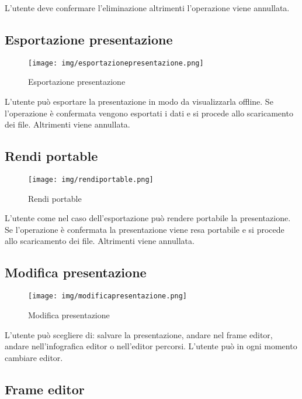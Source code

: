 L'utente deve confermare l'eliminazione altrimenti l'operazione viene annullata.

\subsection{Esportazione presentazione}

\begin{figure}[h!]
		\centering
		\texttt{[image: img/esportazionepresentazione.png]}
		\caption{Esportazione presentazione}
		\label{fig:ModelloSpy}
\end{figure}

L'utente può esportare la presentazione in modo da visualizzarla offline. Se l'operazione è confermata vengono esportati i dati e si procede allo scaricamento dei file. Altrimenti viene annullata.

\subsection{Rendi portable}

\begin{figure}[h!]
		\centering
		\texttt{[image: img/rendiportable.png]}
		\caption{Rendi portable}
		\label{fig:ModelloSpy}
\end{figure}

L'utente come nel caso dell'esportazione può rendere portabile la presentazione. Se l'operazione è confermata la presentazione viene resa portabile e si procede allo scaricamento dei file. Altrimenti viene annullata.

\subsection{Modifica presentazione}

\begin{figure}[h!]
		\centering
		\texttt{[image: img/modificapresentazione.png]}
		\caption{Modifica presentazione}
		\label{fig:ModelloSpy}
\end{figure}

L'utente può scegliere di: salvare la presentazione, andare nel frame editor, andare nell'infografica editor o nell'editor percorsi.
L'utente può in ogni momento cambiare editor.

\subsection{Frame editor}

